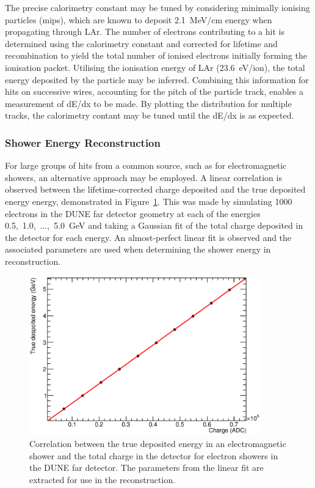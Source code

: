 The precise calorimetry constant may be tuned by considering minimally ionising particles (mips), which are known to deposit 2.1~MeV/cm energy when propagating through LAr.  The number of electrons contributing to a hit is determined using the calorimetry constant and corrected for lifetime and recombination to yield the total number of ionised electrons initially forming the ionisation packet.  Utilising the ionisation energy of LAr (23.6~eV/ion), the total energy deposited by the particle may be inferred.  Combining this information for hits on successive wires, accounting for the pitch of the particle track, enables a measurement of dE/dx to be made.  By plotting the distribution for multiple tracks, the calorimetry contant may be tuned until the dE/dx is as expected.

\subsubsection{Shower Energy Reconstruction}\label{sec:ShowerEnergy}

For large groups of hits from a common source, such as for electromagnetic showers, an alternative approach may be employed.  A linear correlation is observed between the lifetime-corrected charge deposited and the true deposited energy energy, demonstrated in Figure~\ref{fig:ShowerEnergyConversion}.  This was made by simulating 1000 electrons in the DUNE far detector geometry at each of the energies 0.5,~1.0,~...,~5.0~GeV and taking a Gaussian fit of the total charge deposited in the detector for each energy.  An almost-perfect linear fit is observed and the associated parameters are used when determining the shower energy in reconstruction.

\begin{figure}
  \centering
  \includegraphics[width=10cm]{ShowerEnergyConversionFD.eps}
  \caption[Correlation between the true deposited energy in an electromagnetic shower and the total charge in the detector for electron showers in the DUNE far detector.]{Correlation between the true deposited energy in an electromagnetic shower and the total charge in the detector for electron showers in the DUNE far detector.  The parameters from the linear fit are extracted for use in the reconstruction.}
  \label{fig:ShowerEnergyConversion}
\end{figure}

